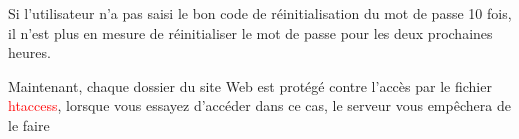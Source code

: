 \documentclass{article}
\begin{document}
\begin{enumerate}
   
  
\vspace{0.7cm}
               \hspace*{-0.7in}
               \noindent{} 



Si l'utilisateur n'a pas saisi le bon code de réinitialisation du mot de passe 10 fois, il n'est plus en mesure de réinitialiser le mot de passe pour les deux prochaines heures.



  
\vspace{0.7cm}
               \hspace*{-0.7in}
               \noindent{} 



\vspace{0.7cm}
Maintenant, chaque dossier du site Web est protégé contre l'accès par le fichier \textcolor{red}{htaccess}, lorsque vous essayez d'accéder dans ce cas, le serveur vous empêchera de le faire


\end{enumerate}
\end{document}
